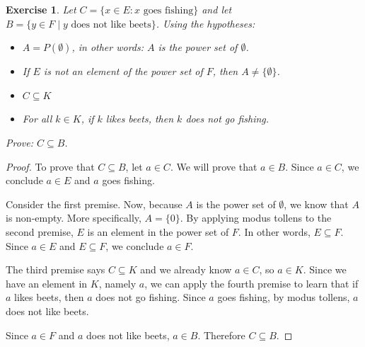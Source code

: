 \documentclass{book}
\newcounter{ekcounter}%
\theoremstyle{ekimcustom}
\newtheorem{exercise}[ekcounter]{Exercise}
\begin{document}
\begin{exercise}
Let $C = \{x \in E: x \text{ goes fishing}\}$ and let $B=\{y \in F \mid y \text{ does not like beets}\}$.
Using the hypotheses:
\begin{itemize}
\item $A = P(\emptyset)$, in other words: $A$ is the power set of $\emptyset$.
\item If $E$ is not an element of the power set of $F$, then $A \not= \{\emptyset\}$.
\item $C \subseteq K$
\item For all $k \in K$, if $k$ likes beets, then $k$ does not go fishing.
\end{itemize}
Prove: $C \subseteq B$. %
\end{exercise}
\begin{proof}
To prove that $C \subseteq B$, let $a \in C$. We will prove that $a \in B$. Since $a \in C$, we conclude $a \in E$ and $a$ goes fishing.

Consider the first premise. Now, because $A$ is the power set of $\emptyset$, we know that $A$ is non-empty. More specifically, $A=\{0\}$. By applying modus tollens to the second premise, $E$ is an element in the power set of $F$. In other words, $E \subseteq F$. Since $a \in E$ and $E \subseteq F$, we conclude $a \in F$.

The third premise says $C \subseteq K$ and we already know $a \in C$, so $a \in K$. Since we have an element in $K$, namely $a$, we can apply the fourth premise to learn that if $a$ likes beets, then $a$ does not go fishing. Since $a$ goes fishing, by modus tollens, $a$ does not like beets.

Since $a \in F$ and $a$ does not like beets, $a \in B$. Therefore $C \subseteq B$.
\end{proof}
\end{document}
